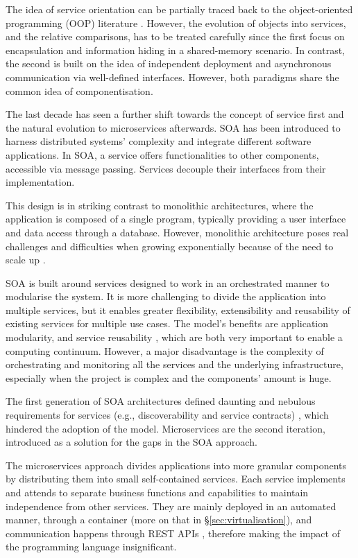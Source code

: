 The idea of service orientation can be partially traced back to the object-oriented programming (OOP) literature \cite{dragoni2017microservices}. However, the evolution of objects into services, and the relative comparisons, has to be treated carefully since the first focus on encapsulation and information hiding in a shared-memory scenario. In contrast, the second is built on the idea of independent deployment and asynchronous communication via well-defined interfaces. However, both paradigms share the common idea of componentisation.

The last decade has seen a further shift towards the concept of service first and the natural evolution to microservices afterwards. SOA has been introduced to harness distributed systems' complexity and integrate different software applications. In SOA, a service offers functionalities to other components, accessible via message passing. Services decouple their interfaces from their implementation.

This design is in striking contrast to monolithic architectures, where the application is composed of a single program, typically providing a user interface and data access through a database. However, monolithic architecture poses real challenges and difficulties when growing exponentially because of the need to scale up \cite{dragoni2017microservices}.

SOA is built around services designed to work in an orchestrated manner to modularise the system. It is more challenging to divide the application into multiple services, but it enables greater flexibility, extensibility and reusability of existing services for multiple use cases. The model's benefits are application modularity, and service reusability \cite{lynn2020cloud}, which are both very important to enable a computing continuum. However, a major disadvantage is the complexity of orchestrating and monitoring all the services and the underlying infrastructure, especially when the project is complex and the components' amount is huge.

The first generation of SOA architectures defined daunting and nebulous requirements for services (e.g., discoverability and service contracts) \cite{dragoni2017microservices}, which hindered the adoption of the model. Microservices are the second iteration, introduced as a solution for the gaps in the SOA approach.

The microservices approach divides applications into more granular components by distributing them into small self-contained services. Each service implements and attends to separate business functions and capabilities to maintain independence from other services. They are mainly deployed in an automated manner, through a container (more on that in §\ref{sec:virtualisation}), and communication happens through REST APIs \cite{rest}, therefore making the impact of the programming language insignificant.

